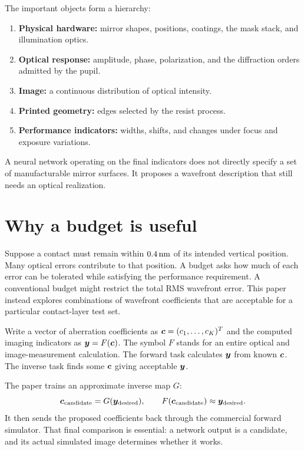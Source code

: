 The important objects form a hierarchy:
\begin{enumerate}
\item \textbf{Physical hardware:} mirror shapes, positions, coatings,
the mask stack, and illumination optics.
\item \textbf{Optical response:} amplitude, phase, polarization, and the
diffraction orders admitted by the pupil.
\item \textbf{Image:} a continuous distribution of optical intensity.
\item \textbf{Printed geometry:} edges selected by the resist process.
\item \textbf{Performance indicators:} widths, shifts, and changes under
focus and exposure variations.
\end{enumerate}
A neural network operating on the final indicators does not directly
specify a set of manufacturable mirror surfaces. It proposes a wavefront
description that still needs an optical realization.

\section{Why a budget is useful}
Suppose a contact must remain within $0.4\,\mathrm{nm}$ of its intended vertical
position. Many optical errors contribute to that position. A budget asks
how much of each error can be tolerated while satisfying the performance
requirement. A conventional budget might restrict the total RMS wavefront
error. This paper instead explores combinations of wavefront coefficients
that are acceptable for a particular contact-layer test set.

Write a vector of aberration coefficients as
$\bm{c}=(c_1,\ldots,c_K)^T$ and the computed imaging indicators as
$\bm{y}=F(\bm{c})$. The symbol $F$ stands for an entire optical and
image-measurement calculation. The forward task calculates $\bm{y}$
from known $\bm{c}$. The inverse task finds some $\bm{c}$ giving acceptable
$\bm{y}$.

The paper trains an approximate inverse map $G$:
\[
\bm{c}_{\rm candidate}=G(\bm{y}_{\rm desired}),\qquad
F(\bm{c}_{\rm candidate})\approx\bm{y}_{\rm desired}.
\]
It then sends the proposed coefficients back through the commercial
forward simulator. That final comparison is essential: a network output
is a candidate, and its actual simulated image determines whether it works.


